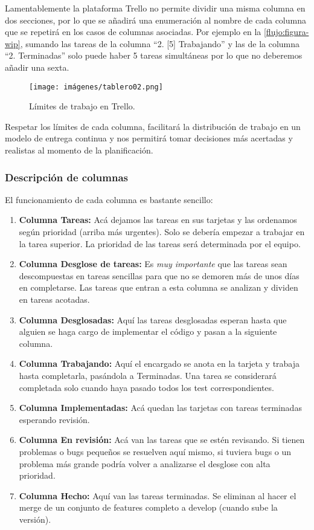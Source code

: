 Lamentablemente la plataforma Trello no permite dividir una misma columna en dos secciones, por lo que se añadirá una enumeración al nombre de cada columna que se repetirá en los casos de columnas asociadas. Por ejemplo en la \autoref{flujo:figura-wip}, sumando las tareas de la columna “2. [5] Trabajando” y las de la columna “2. Terminadas” solo puede haber 5 tareas simultáneas por lo que no deberemos añadir una sexta.

\begin{figure}[h]
	\centering
	\caption{Límites de trabajo en Trello.}
	\label{flujo:figura-wip}
	\texttt{[image: imágenes/tablero02.png]}
\end{figure}

Respetar los límites de cada columna, facilitará la distribución de trabajo en un modelo de entrega continua y nos permitirá tomar decisiones más acertadas y realistas al momento de la planificación.

\subsubsection{Descripción de columnas}\label{flujo:descripcion-de-columnas}
El funcionamiento de cada columna es bastante sencillo:
\begin{enumerate}
	\item \textbf{Columna Tareas:} Acá dejamos las tareas en sus tarjetas y las ordenamos según prioridad (arriba más urgentes). Solo se debería empezar a trabajar en la tarea superior. La prioridad de las tareas será determinada por el equipo.
	\item \textbf{Columna Desglose de tareas:} Es \textit{muy importante} que las tareas sean descompuestas en tareas sencillas para que no se demoren más de unos días en completarse. Las tareas que entran a esta columna se analizan y dividen en tareas acotadas.
	\item \textbf{Columna Desglosadas:} Aquí las tareas desglosadas esperan hasta que alguien se haga cargo de implementar el código y pasan a la siguiente columna.
	\item \textbf{Columna Trabajando:} Aquí el encargado se anota en la tarjeta y trabaja hasta completarla, pasándola a Terminadas. Una tarea se considerará completada solo cuando haya pasado todos los test correspondientes.
	\item \textbf{Columna Implementadas:} Acá quedan las tarjetas con tareas terminadas esperando revisión.
	\item \textbf{Columna En revisión:} Acá van las tareas que se estén revisando. Si tienen problemas o bugs pequeños se resuelven aquí mismo, si tuviera bugs o un problema más grande podría volver a analizarse el desglose con alta prioridad.
	\item \textbf{Columna Hecho:} Aquí van las tareas terminadas. Se eliminan al hacer el merge de un conjunto de features completo a develop (cuando sube la versión).
\end{enumerate}

